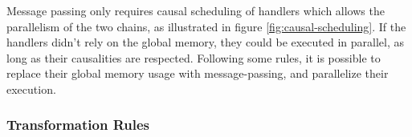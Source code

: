 Message passing only requires causal scheduling of handlers which allows the parallelism of the two chains, as illustrated  in figure \ref{fig:causal-scheduling}.
If the handlers didn't rely on the global memory, they could be executed in parallel, as long as their causalities are respected.
Following some rules, it is possible to replace their global memory usage with message-passing, and parallelize their execution.

\subsubsection{Transformation Rules}

\begin{figure}[h!]%
  \centering{}%
\end{figure}

